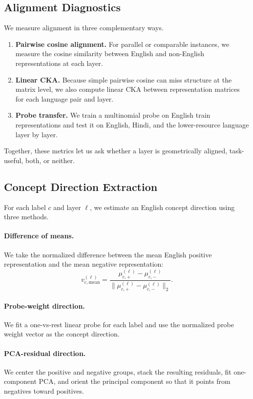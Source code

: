 \documentclass[11pt]{article}
\begin{document}
\subsection{Alignment Diagnostics}
We measure alignment in three complementary ways.
\begin{enumerate}[leftmargin=*,itemsep=2pt]
    \item \textbf{Pairwise cosine alignment.} For parallel or comparable instances, we measure the cosine similarity between English and non-English representations at each layer.
    \item \textbf{Linear CKA.} Because simple pairwise cosine can miss structure at the matrix level, we also compute linear CKA \citep{kornblith2019cka} between representation matrices for each language pair and layer.
    \item \textbf{Probe transfer.} We train a multinomial probe on English train representations and test it on English, Hindi, and the lower-resource language layer by layer.
\end{enumerate}
Together, these metrics let us ask whether a layer is geometrically aligned, task-useful, both, or neither.

\subsection{Concept Direction Extraction}
For each label $c$ and layer $\ell$, we estimate an English concept direction using three methods.
\paragraph{Difference of means.}
We take the normalized difference between the mean English positive representation and the mean negative representation:
\begin{equation}
    v_{c,\mathrm{mean}}^{(\ell)} = \frac{\mu_{c,+}^{(\ell)} - \mu_{c,-}^{(\ell)}}{\lVert \mu_{c,+}^{(\ell)} - \mu_{c,-}^{(\ell)} \rVert_2}.
\end{equation}
\paragraph{Probe-weight direction.}
We fit a one-vs-rest linear probe for each label and use the normalized probe weight vector as the concept direction.
\paragraph{PCA-residual direction.}
We center the positive and negative groups, stack the resulting residuals, fit one-component PCA, and orient the principal component so that it points from negatives toward positives.
\end{document}
